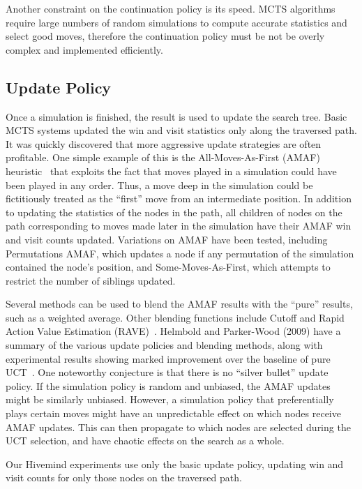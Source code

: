 \documentclass{acm_proc_article-sp}
\begin{document}
Another constraint on the continuation policy is its speed.  
MCTS algorithms require large numbers of random simulations to compute accurate statistics and select good moves, therefore the continuation policy must be not be overly complex and implemented efficiently.

\subsection{Update Policy}
Once a simulation is finished, the result is used to update the search tree.
Basic MCTS systems updated the win and visit statistics only along the traversed path.
It was quickly discovered that more aggressive update strategies are often profitable.
One simple example of this is the All-Moves-As-First (AMAF) heuristic~\cite{}
that exploits the fact that moves played in a simulation could have been played in any order. 
Thus, a move deep in the simulation could be fictitiously treated as the ``first'' move from an intermediate position. 
In addition to updating the statistics of the nodes in the path, all children of nodes on the path corresponding to moves made later
in the simulation have their AMAF win and visit counts updated. 
Variations on AMAF have been tested, including Permutations AMAF, which updates a node if any permutation of the simulation contained the node's position, and Some-Moves-As-First, which attempts to restrict the number of siblings updated.

Several methods can be used to blend the AMAF results with the ``pure'' results, such as a weighted average.
Other blending functions include Cutoff and Rapid Action Value Estimation (RAVE)~\cite{chaslot2008progressive}. 
Helmbold and Parker-Wood (2009) have a summary of the various update policies and blending methods, along with experimental results showing marked improvement over the baseline of pure UCT~\cite{helmbold2009all}. 
One noteworthy conjecture is that there is no ``silver bullet'' update policy. If the simulation policy is random and unbiased, the AMAF updates might be similarly unbiased. However, a simulation policy that preferentially plays certain moves might have an unpredictable effect on which nodes receive AMAF updates. This can then propagate to which nodes are selected during the UCT selection, and have chaotic effects on the search as a whole. 

Our Hivemind experiments use only the basic update policy, updating win and visit counts for only those nodes on the traversed path.
\end{document}
